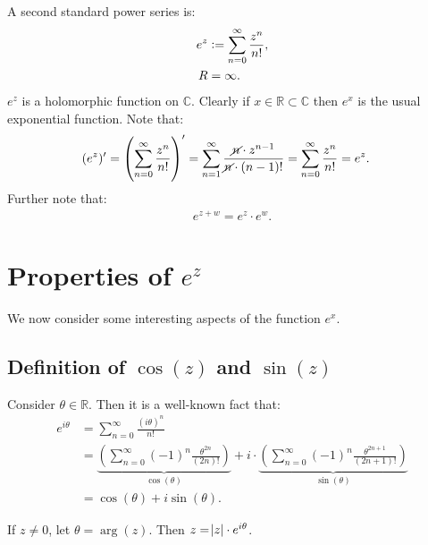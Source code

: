 \begin{example} A second standard power series is:
\begin{align*}
    e^z&\vcentcolon = \sum_{n=0}^\infty \frac{z^n}{n!} , \\
    R&= \infty.
\end{align*}
$e^z$ is a holomorphic function on $\mathbb{C}$. Clearly if $x\in\mathbb{R}\subset\mathbb{C}$ then $e^x$ is the usual exponential function. Note that:
\begin{align*}
    (e^z)' &= \left( \sum_{n=0}^\infty \frac{z^n}{n!} \right)'= \sum_{n=1}^\infty \frac{\cancel{n}\cdot z^{n-1}}{\cancel{n}\cdot (n-1)!}= \sum_{n=0}^\infty \frac{z^n}{n!}= e^z.
\end{align*}
Further note that:
\begin{align*}
    e^{z+w} = e^z\cdot e^w.
\end{align*}
\end{example}

\section{Properties of $e^z$}
We now consider some interesting aspects of the function $e^x$.
\subsection{Definition of $\cos(z)$ and $\sin(z)$}

Consider $\theta \in \mathbb{R}$. Then it is a well-known fact that:
\begin{align*}
    e^{i\theta}&=\sum_{n=0}^\infty \frac{(i\theta)^n}{n!}\\
    &= \underbrace{\left( \sum_{n=0}^\infty (-1)^n \frac{\theta^{2n}}{(2n)!}  \right)}_{\cos(\theta)} + i \cdot \underbrace{\left( \sum_{n=0}^\infty (-1)^n \frac{\theta^{2n+1}}{(2n+1)!}  \right)}_{\sin(\theta)}\\
    &= \cos(\theta)+i\sin(\theta).
\end{align*}

\begin{remark}
If $z\neq0$, let $\theta = \arg(z)$. Then $z=\abs{z}\cdot e^{i\theta}$.
\end{remark}

